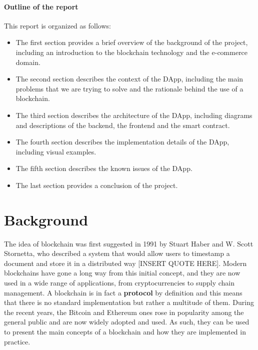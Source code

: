 \documentclass[12pt,a4paper,oneside]{article}
\theoremstyle{definition}
\begin{document}
\paragraph{Outline of the report} This report is organized as follows:
\begin{itemize}
	\item The first section provides a brief overview of the background of the project, including an introduction to the blockchain technology and the e-commerce domain.
	\item The second section describes the context of the DApp, including the main problems that we are trying to solve and the rationale behind the use of a blockchain.
	\item The third section describes the architecture of the DApp, including diagrams and descriptions of the backend, the frontend and the smart contract.
	\item The fourth section describes the implementation details of the DApp, including visual examples.
	\item The fifth section describes the known issues of the DApp.
	\item The last section provides a conclusion of the project.
\end{itemize}

\section{Background}

The idea of blockchain was first suggested in 1991 by Stuart Haber and W. Scott Stornetta, who described a system that would allow users to timestamp a document and store it in a distributed way [INSERT QUOTE HERE]. Modern blockchains have gone a long way from this initial concept, and they are now used in a wide range of applications, from cryptocurrencies to supply chain management. A blockchain is in fact a \textbf{protocol} by definition and this means that there is no standard implementation but rather a multitude of them.
During the recent years, the Bitcoin and Ethereum ones rose in popularity among the general public and are now widely adopted and used. As such, they can be used to present the main concepts of a blockchain and how they are implemented in practice.
\end{document}
